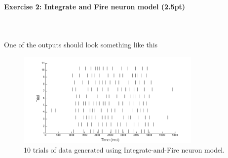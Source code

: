 \documentclass[a4paper,11pt]{article}
\newenvironment{exercise}[3]{\paragraph{Exercise #1: #2 (#3pt)}\ \\}{
\medskip}
\begin{document}
\begin{exercise}{2}{Integrate and Fire neuron model}{2.5}
\ \\
One of the outputs should look something like this
\begin{figure}[H]
   \centering
   \includegraphics[width=0.8\textwidth]{raster_plot.png} 
   \caption{10 trials of data generated using Integrate-and-Fire neuron model.}
   \label{fig:rasterplot}
\end{figure}
\end{exercise}
\end{document}
